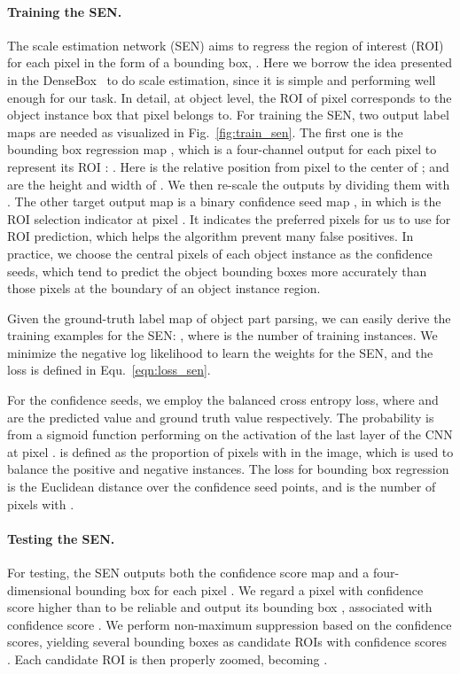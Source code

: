 \documentclass[runningheads]{llncs}
\begin{document}
\paragraph{Training the SEN.}
The scale estimation network (SEN) aims to regress the region of interest (ROI) for each pixel  in the form of a bounding box, . Here we borrow the idea presented in the DenseBox~\cite{huang2015densebox} to do scale estimation, since it is simple and performing well enough for our task. 
In detail, at object level, the ROI of pixel  corresponds to the object instance box that pixel  belongs to. For training the SEN, two output label maps are needed as visualized in Fig.~\ref{fig:train_sen}. The first one is the bounding box regression map , which is a four-channel output for each pixel  to represent its ROI : . Here  is the relative position from pixel  to the center of ;  and  are the height and width of . We then re-scale the outputs by dividing them with . 
The other target output map is a binary confidence seed map , in which  is the ROI selection indicator at pixel . It indicates the preferred pixels for us to use for ROI prediction, which helps the algorithm prevent many false positives. In practice, we choose the central pixels of each object instance as the confidence seeds, which tend to predict the object bounding boxes more accurately than those pixels at the boundary of an object instance region. 

Given the ground-truth label map of object part parsing, we can easily derive the training examples for the SEN: , where  is the number of training instances. We minimize the negative log likelihood to learn the weights  for the SEN, and the loss  is defined in Equ.~\ref{eqn:loss_sen}.
{\small

}
For the confidence seeds, we employ the balanced cross entropy loss, where  and  are the predicted value and ground truth value respectively. The probability is from a sigmoid function performing on the activation of the last layer of the CNN at pixel .   is defined as the proportion of pixels with  in the image, which is used to balance the positive and negative instances. The loss for bounding box regression is the Euclidean distance over the confidence seed points, and  is the number of pixels with .

\paragraph{Testing the SEN.} For testing, the SEN outputs both the confidence score map  and a four-dimensional bounding box  for each pixel .
We regard a pixel  with confidence score higher than  to be reliable and output its bounding box , associated with confidence score . We perform non-maximum suppression based on the confidence scores, yielding several bounding boxes  as candidate ROIs with confidence scores . Each candidate ROI  is then properly zoomed, becoming .
\end{document}
